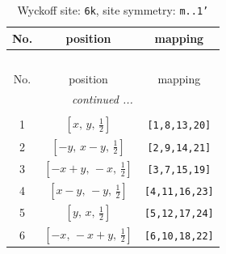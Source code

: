 \documentclass[fleqn,8pt]{jsarticle}
\begin{document}
\renewcommand{\arraystretch}{1.2}
\begin{longtable}{ccc}
\caption{Wyckoff site: {\tt 6k}, site symmetry: {\tt m..1'}}
 \\
 \hline \hline
No. & position & mapping \\ \hline \endfirsthead

\multicolumn{2}{l}{\tablename\ \thetable{}} \\
 \hline \hline
No. & position & mapping \\ \hline \endhead

 \hline \hline
\multicolumn{2}{r}{\footnotesize\it continued ...} \\ \endfoot

 \hline \hline
\multicolumn{2}{r}{} \\ \endlastfoot

1 & $\left[ x,\, y,\, \frac{1}{2} \right]$ & {\tt [1,8,13,20]} \\ \hline
2 & $\left[ - y,\, x - y,\, \frac{1}{2} \right]$ & {\tt [2,9,14,21]} \\ \hline
3 & $\left[ - x + y,\, - x,\, \frac{1}{2} \right]$ & {\tt [3,7,15,19]} \\ \hline
4 & $\left[ x - y,\, - y,\, \frac{1}{2} \right]$ & {\tt [4,11,16,23]} \\ \hline
5 & $\left[ y,\, x,\, \frac{1}{2} \right]$ & {\tt [5,12,17,24]} \\ \hline
6 & $\left[ - x,\, - x + y,\, \frac{1}{2} \right]$ & {\tt [6,10,18,22]} \\
\end{longtable}
\renewcommand{\arraystretch}{1.2}
\end{document}
